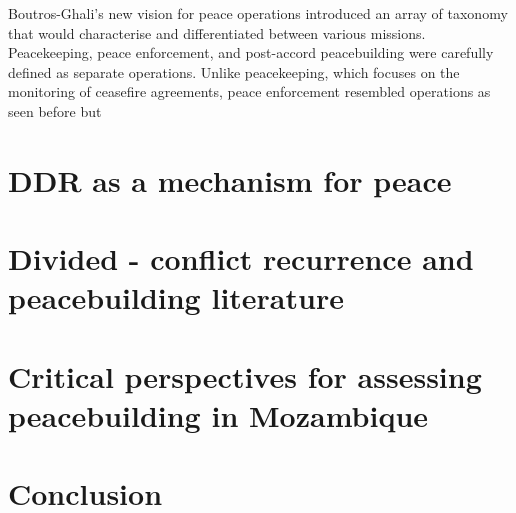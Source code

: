 Boutros-Ghali's new vision for peace operations introduced an array of taxonomy that would characterise and differentiated between various missions. Peacekeeping, peace enforcement, and post-accord peacebuilding were carefully defined as separate operations. Unlike peacekeeping, which focuses on the monitoring of ceasefire agreements, peace enforcement resembled operations as seen before but 



\section{DDR as a mechanism for peace}





\section{Divided - conflict recurrence and peacebuilding literature}





\section{Critical perspectives for assessing peacebuilding in Mozambique}





\section{Conclusion}